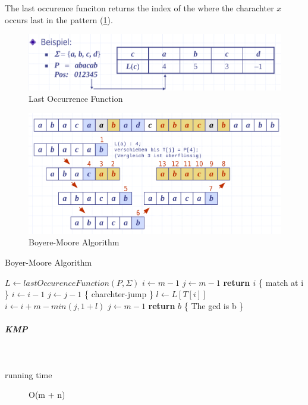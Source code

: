 \documentclass[11pt,twoside,twocolumn,landscape]{article}
\begin{document}
The last occurence funciton returns the index of the where the charachter \(x\) occurs last in the pattern (\ref{fig:org6255113}).

\begin{figure}[htbp]
\centering
\includegraphics[width=.9\linewidth]{img/lastOccurrence.png}
\caption{\label{fig:org6255113}Last Occurrence Function}
\end{figure}

\begin{figure}[htbp]
\centering
\includegraphics[width=.9\linewidth]{img/boyere_moore.png}
\caption{Boyere-Moore Algorithm}
\end{figure}


\begin{algorithm}
  \caption{Boyer-Moore Algorithm}
  \begin{algorithmic}[1]
    \State $L \leftarrow lastOccurenceFunction(P, \Sigma)$
    \State $i \leftarrow m - 1$
    \State $j \leftarrow m - 1$
    \Repeat
    \State \textbf{return $i$} \{ match at i \}
    \Else
    \State $i \leftarrow i - 1$
    \State $j \leftarrow j - 1$
    \EndIf
    \State \{ charchter-jump \}
    \State $l \leftarrow L[T[i]]$
    \State $i \leftarrow i + m - min(j, 1 + l)$
    \State $j \leftarrow m - 1$
    \EndIf
    \State \textbf{return} $b$ \{ The gcd is b \}
    \EndProcedure
  \end{algorithmic}
\end{algorithm}

\subparagraph{KMP} \
\label{sec:orgcca4f24}

\begin{description}
\item[{running time}] O(m + n)
\end{description}
\end{document}
